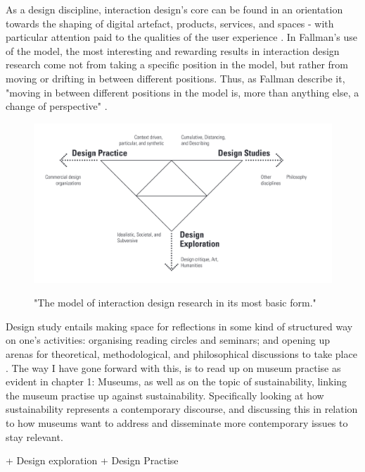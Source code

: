 As a design discipline, interaction design’s core can be found in an orientation towards the shaping of digital artefact, products, services, and spaces - with particular attention paid to the qualities of the user experience \autocite[p. 4]{fallman_triangle_2008}. In Fallman’s use of the model, the most interesting and rewarding results in interaction design research come not from taking a specific position in the model, but rather from moving or drifting in between different positions. Thus, as Fallman describe it, "moving in between different positions in the model is, more than anything else, a change of perspective" \autocite[p. 10]{fallman_triangle_2008}.


\begin{figure}[H]
\includegraphics[width=13cm]{pictures/process/triangle.png}
\caption{"The model of interaction design research in its most basic form."}
\autocite[p. 5]{fallman_triangle_2008}
\centering 
\end{figure}



Design study entails making space for reflections in some kind of structured way on one’s activities: organising reading circles and seminars; and opening up arenas for theoretical, methodological, and philosophical discussions to take place \autocite[p. 18]{fallman_triangle_2008}. The way I have gone forward with this, is to read up on museum practise as evident in chapter 1: Museums, as well as on the topic of sustainability, linking the museum practise up against sustainability. Specifically looking at how sustainability represents a contemporary discourse, and discussing this in relation to how museums want to address and disseminate more contemporary issues to stay relevant. 

+ Design exploration
+ Design Practise


